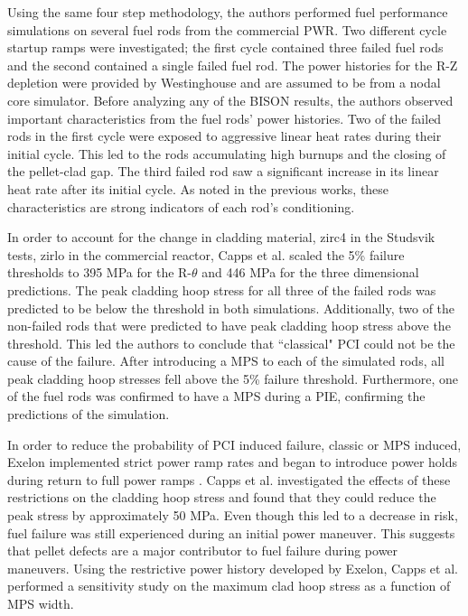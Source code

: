 \documentclass[edeposit,fullpage,11pt]{uiucthesis2009}
\begin{document}
Using the same four step methodology, the authors performed fuel performance simulations on several fuel rods from the commercial \gls{PWR}.
Two different cycle startup ramps were investigated; the first cycle contained three failed fuel rods and the second contained a single failed fuel rod.
The power histories for the R-Z depletion were provided by Westinghouse and are assumed to be from a nodal core simulator.
Before analyzing any of the BISON results, the authors observed important characteristics from the fuel rods' power histories.
Two of the failed rods in the first cycle were exposed to aggressive linear heat rates during their initial cycle.
This led to the rods accumulating high burnups and the closing of the pellet-clad gap.
The third failed rod saw a significant increase in its linear heat rate after its initial cycle.
As noted in the previous works, these characteristics are strong indicators of each rod's conditioning.

In order to account for the change in cladding material, zirc4 in the Studsvik tests, zirlo in the commercial reactor, Capps et al. scaled the 5\% failure thresholds to 395 MPa for the R-$\theta$ and 446 MPa for the three dimensional predictions.
The peak cladding hoop stress for all three of the failed rods was predicted to be below the threshold in both simulations.
Additionally, two of the non-failed rods that were predicted to have peak cladding hoop stress above the threshold. 
This led the authors to conclude that ``classical" \gls{PCI} could not be the cause of the failure.
After introducing a \gls{MPS} to each of the simulated rods, all peak cladding hoop stresses fell above the 5\% failure threshold.
Furthermore, one of the fuel rods was confirmed to have a \gls{MPS} during a \gls{PIE}, confirming the predictions of the simulation.

In order to reduce the probability of \gls{PCI} induced failure, classic or \gls{MPS} induced, Exelon implemented strict power ramp rates and began to introduce power holds during return to full power ramps \cite{capps_pci_2017}.
Capps et al. investigated the effects of these restrictions on the cladding hoop stress and found that they could reduce the peak stress by approximately 50 MPa.
Even though this led to a decrease in risk, fuel failure was still experienced during an initial power maneuver.
This suggests that pellet defects are a major contributor to fuel failure during power maneuvers. 
Using the restrictive power history developed by Exelon, Capps et al. performed a sensitivity study on the maximum clad hoop stress as a function of \gls{MPS} width.
\end{document}
